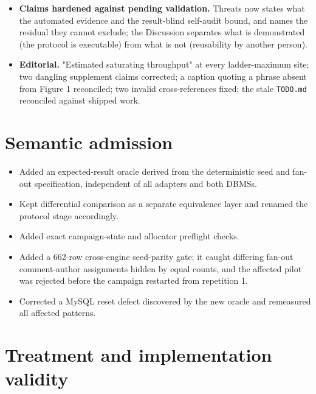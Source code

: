 \documentclass[11pt,a4paper]{article}
\begin{document}
\begin{itemize}
  \item \textbf{Claims hardened against pending validation.} Threats now states what the automated evidence and the result-blind self-audit bound, and names the residual they cannot exclude; the Discussion separates what is demonstrated (the protocol is executable) from what is not (reusability by another person).
  \item \textbf{Editorial.} "Estimated saturating throughput" at every ladder-maximum site; two dangling supplement claims corrected; a caption quoting a phrase absent from Figure 1 reconciled; two invalid cross-references fixed; the stale \texttt{TODO.md} reconciled against shipped work.
\end{itemize}

\section*{Semantic admission}

\begin{itemize}
  \item Added an expected-result oracle derived from the deterministic seed and fan-out specification, independent of all adapters and both DBMSs.
  \item Kept differential comparison as a separate equivalence layer and renamed the protocol stage accordingly.
  \item Added exact campaign-state and allocator preflight checks.
  \item Added a 662-row cross-engine seed-parity gate; it caught differing fan-out comment-author assignments hidden by equal counts, and the affected pilot was rejected before the campaign restarted from repetition 1.
  \item Corrected a MySQL reset defect discovered by the new oracle and remeasured all affected patterns.
\end{itemize}

\section*{Treatment and implementation validity}
\end{document}
